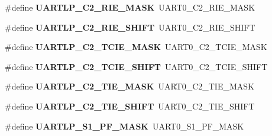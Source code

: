 \begin{DoxyCompactItemize}
\item 
\hypertarget{group___backward___compatibility___symbols_gac3c789d6eafa116990b4ead8ff24877c}{}\#define {\bfseries U\+A\+R\+T\+L\+P\+\_\+\+C2\+\_\+\+R\+I\+E\+\_\+\+M\+A\+S\+K}~U\+A\+R\+T0\+\_\+\+C2\+\_\+\+R\+I\+E\+\_\+\+M\+A\+S\+K\label{group___backward___compatibility___symbols_gac3c789d6eafa116990b4ead8ff24877c}

\item 
\hypertarget{group___backward___compatibility___symbols_gaad81a706759dd0db2ca7d73b26c54329}{}\#define {\bfseries U\+A\+R\+T\+L\+P\+\_\+\+C2\+\_\+\+R\+I\+E\+\_\+\+S\+H\+I\+F\+T}~U\+A\+R\+T0\+\_\+\+C2\+\_\+\+R\+I\+E\+\_\+\+S\+H\+I\+F\+T\label{group___backward___compatibility___symbols_gaad81a706759dd0db2ca7d73b26c54329}

\item 
\hypertarget{group___backward___compatibility___symbols_ga96867f1c59f537c310fa32eb0722e075}{}\#define {\bfseries U\+A\+R\+T\+L\+P\+\_\+\+C2\+\_\+\+T\+C\+I\+E\+\_\+\+M\+A\+S\+K}~U\+A\+R\+T0\+\_\+\+C2\+\_\+\+T\+C\+I\+E\+\_\+\+M\+A\+S\+K\label{group___backward___compatibility___symbols_ga96867f1c59f537c310fa32eb0722e075}

\item 
\hypertarget{group___backward___compatibility___symbols_ga49ccd6611c47944d69e14ec4ad710c0f}{}\#define {\bfseries U\+A\+R\+T\+L\+P\+\_\+\+C2\+\_\+\+T\+C\+I\+E\+\_\+\+S\+H\+I\+F\+T}~U\+A\+R\+T0\+\_\+\+C2\+\_\+\+T\+C\+I\+E\+\_\+\+S\+H\+I\+F\+T\label{group___backward___compatibility___symbols_ga49ccd6611c47944d69e14ec4ad710c0f}

\item 
\hypertarget{group___backward___compatibility___symbols_ga8b17a7eada73c13310ee58bd2f2791d5}{}\#define {\bfseries U\+A\+R\+T\+L\+P\+\_\+\+C2\+\_\+\+T\+I\+E\+\_\+\+M\+A\+S\+K}~U\+A\+R\+T0\+\_\+\+C2\+\_\+\+T\+I\+E\+\_\+\+M\+A\+S\+K\label{group___backward___compatibility___symbols_ga8b17a7eada73c13310ee58bd2f2791d5}

\item 
\hypertarget{group___backward___compatibility___symbols_ga151bc121eebeab1b1e5e3b989d513f18}{}\#define {\bfseries U\+A\+R\+T\+L\+P\+\_\+\+C2\+\_\+\+T\+I\+E\+\_\+\+S\+H\+I\+F\+T}~U\+A\+R\+T0\+\_\+\+C2\+\_\+\+T\+I\+E\+\_\+\+S\+H\+I\+F\+T\label{group___backward___compatibility___symbols_ga151bc121eebeab1b1e5e3b989d513f18}

\item 
\hypertarget{group___backward___compatibility___symbols_ga5e7d9c4c91cbaa076c560376f15f6da1}{}\#define {\bfseries U\+A\+R\+T\+L\+P\+\_\+\+S1\+\_\+\+P\+F\+\_\+\+M\+A\+S\+K}~U\+A\+R\+T0\+\_\+\+S1\+\_\+\+P\+F\+\_\+\+M\+A\+S\+K\label{group___backward___compatibility___symbols_ga5e7d9c4c91cbaa076c560376f15f6da1}


\end{DoxyCompactItemize}
